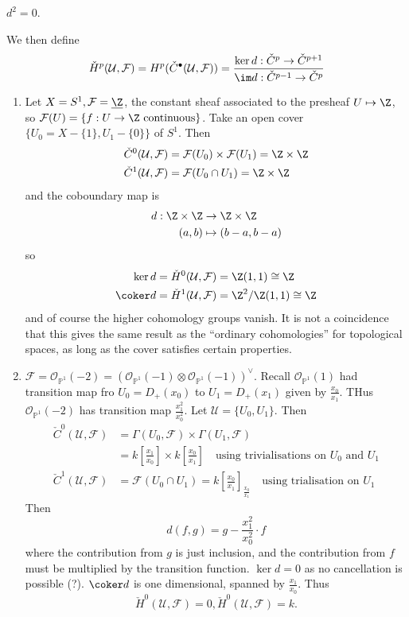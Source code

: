 \documentclass[a4paper]{article}
\renewcommand*{\P}{\mathbb{P}}
\newcommand{\sh}[1]{\mathcal{#1}} %
\begin{document}
\begin{ex}
  \(d^2 = 0\).
\end{ex}
We then define
\[
  \check H^p(\mathcal U, \sh F) = H^p(\check C^\bullet(\mathcal U, \sh F)) = \frac{\ker d: \check C^p \to \check C^{p + 1}}{\im d: \check C^{p - 1} \to \check C^p}
\]

\begin{eg}\leavevmode
  \begin{enumerate}
  \item Let \(X = S^1, \sh F = \underline \Z\), the constant sheaf associated to the presheaf \(U \mapsto \Z\), so \(\sh F(U) = \{f: U \to \Z \text{ continuous}\}\). Take an open cover \(\{U_0 = X - \{1\}, U_1 - \{0\}\}\) of \(S^1\). Then
    \begin{align*}
      \check C^0(\mathcal U, \sh F) &= \sh F(U_0) \times \sh F(U_1) = \Z \times \Z \\
      \check C^1(\mathcal U, \sh F) &= \sh F(U_0 \cap U_1) = \Z \times \Z
    \end{align*}
    and the coboundary map is
    \begin{align*}
      d: \Z \times \Z &\to \Z \times \Z \\
      (a, b) &\mapsto (b - a, b - a)
    \end{align*}
    so
    \begin{align*}
      \ker d &= \check H^0(\mathcal U, \sh F) = \Z(1, 1) \cong \Z \\
      \coker d &= \check H^1(\mathcal U, \sh F) = \Z^2/\Z(1, 1) \cong \Z
    \end{align*}
    and of course the higher cohomology groups vanish. It is not a coincidence that this gives the same result as the ``ordinary cohomologies'' for topological spaces, as long as the cover satisfies certain properties.
  \item \(\sh F = \sh O_{\P^1}(-2) = (\sh O_{\P^1}(-1) \otimes \sh O_{\P^1}(-1))^\vee\). Recall \(\sh O_{\P^1}(1)\) had transition map fro \(U_0 = D_+(x_0)\) to \(U_1 = D_+(x_1)\) given by \(\frac{x_0}{x_1}\). THus \(\sh O_{\P^1}(-2)\) has transition map \(\frac{x_1^2}{x_0^2}\). Let \(\mathcal U = \{U_0, U_1\}\). Then
    \begin{align*}
      \check C^0(\mathcal U, \sh F) &= \Gamma(U_0, \sh F) \times \Gamma(U_1, \sh F) \\
                                               &= k[\frac{x_1}{x_0}] \times k[\frac{x_0}{x_1}] \quad \text{using trivialisations on \(U_0\) and \(U_1\)} \\
      \check C^1(\mathcal U, \sh F) &= \sh F(U_0 \cap U_1) = k[\frac{x_0}{x_1}]_{\frac{x_0}{x_1}} \quad \text{using trialisation on \(U_1\)}
    \end{align*}
    Then
    \[
      d(f, g) = g - \frac{x_1^2}{x_0^2} \cdot f
    \]
    where the contribution from \(g\) is just inclusion, and the contribution from \(f\) must be multiplied by the transition function. \(\ker d = 0\) as no cancellation is possible (?). \(\coker d\) is one dimensional, spanned by  \(\frac{x_1}{x_0}\). Thus
    \[
      \check H^0(\mathcal U, \sh F) = 0, \check H^0(\mathcal U, \sh F) = k.
    \]


\end{enumerate}
\end{eg}
\end{document}
